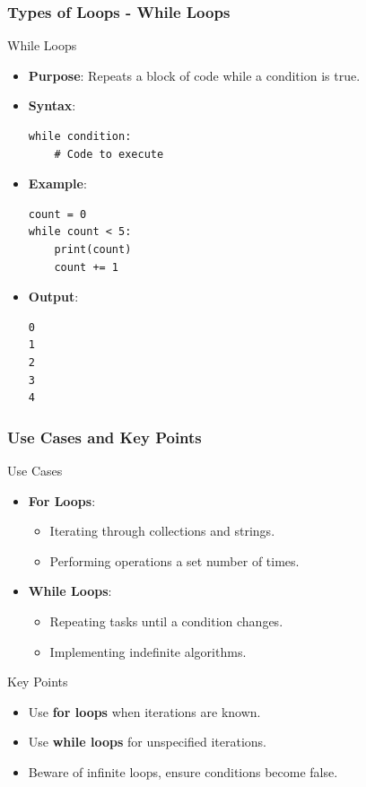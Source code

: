 \documentclass{beamer}
\begin{document}
\begin{frame}[fragile]
    \frametitle{Types of Loops - While Loops}
    \begin{block}{While Loops}
        \begin{itemize}
            \item \textbf{Purpose}: Repeats a block of code while a condition is true.
            \item \textbf{Syntax}:
            \begin{lstlisting}
while condition:
    # Code to execute
            \end{lstlisting}
            \item \textbf{Example}:
            \begin{lstlisting}
count = 0
while count < 5:
    print(count)
    count += 1
            \end{lstlisting}
            \item \textbf{Output}:
            \begin{lstlisting}
0
1
2
3
4
            \end{lstlisting}
        \end{itemize}
    \end{block}
\end{frame}

\begin{frame}[fragile]
    \frametitle{Use Cases and Key Points}
    \begin{block}{Use Cases}
        \begin{itemize}
            \item \textbf{For Loops}:
            \begin{itemize}
                \item Iterating through collections and strings.
                \item Performing operations a set number of times.
            \end{itemize}
            \item \textbf{While Loops}:
            \begin{itemize}
                \item Repeating tasks until a condition changes.
                \item Implementing indefinite algorithms.
            \end{itemize}
        \end{itemize}
    \end{block}

    \begin{block}{Key Points}
        \begin{itemize}
            \item Use \textbf{for loops} when iterations are known.
            \item Use \textbf{while loops} for unspecified iterations.
            \item Beware of infinite loops, ensure conditions become false.
        \end{itemize}
    \end{block}
\end{frame}
\end{document}

